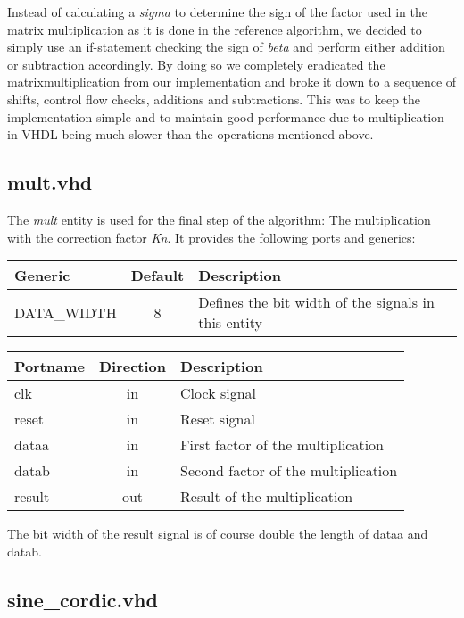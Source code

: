 Instead of calculating a \textit{sigma} to determine the sign of the factor used in the matrix multiplication as it is done in the reference algorithm, we decided to simply use an if-statement checking the sign of \textit{beta} and perform either addition or subtraction accordingly. By doing so we completely eradicated the matrixmultiplication from our implementation and broke it down to a sequence of shifts, control flow checks, additions and subtractions. This was to keep the implementation simple and to maintain good performance due to multiplication in VHDL being much slower than the operations mentioned above.

\subsection{mult.vhd} 

The \textit{mult} entity is used for the final step of the algorithm: The multiplication with the correction factor \textit{Kn}. It provides the following ports and generics:

\begin{center}
	\begin{tabular}{ | l | c | l | }
		\hline
		\textbf{Generic} & \textbf{Default} & \textbf{Description} \\
		\hline
		DATA\_WIDTH & 8 & Defines the bit width of the signals in this entity \\
		\hline
	\end{tabular} 
\end{center}

\begin{center}
	\begin{tabular}{ | l | c | l | }
		\hline
		\textbf{Portname} & \textbf{Direction} & \textbf{Description} \\
		\hline
		clk & in & Clock signal \\
		reset & in  & Reset signal \\
		dataa & in  & First factor of the multiplication \\
		datab & in  & Second factor of the multiplication \\
		result & out  & Result of the multiplication \\
		\hline
	\end{tabular} 
\end{center}

The bit width of the result signal is of course double the length of dataa and datab.

\subsection{sine\_cordic.vhd}

